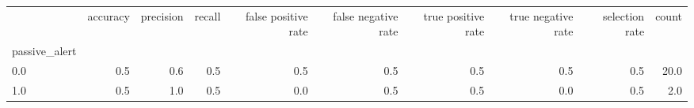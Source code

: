 \begin{tabular}{lrrrrrrrrr}
\toprule
{} &  accuracy &  precision &  recall &  false positive rate &  false negative rate &  true positive rate &  true negative rate &  selection rate &  count \\
passive\_alert &           &            &         &                      &                      &                     &                     &                 &        \\
\midrule
0.0           &       0.5 &        0.6 &     0.5 &                  0.5 &                  0.5 &                 0.5 &                 0.5 &             0.5 &   20.0 \\
1.0           &       0.5 &        1.0 &     0.5 &                  0.0 &                  0.5 &                 0.5 &                 0.0 &             0.5 &    2.0 \\
\bottomrule
\end{tabular}
